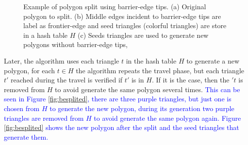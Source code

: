 \begin{figure}[h]
\centering  
{}
\caption{Example of polygon split using barrier-edge tips. (a) Original polygon to split. (b) Middle edges incident to barrier-edge tips are label as frontier-edge and seed triangles (colorful triangles) are store in a hash table $H$ (c) Seeds triangles are used to generate new polygons without barrier-edge tips,  }
\label{figs:splitmid} 
\end{figure}

Later, the algorithm uses each triangle $t$ in the hash table $H$ to generate a new polygon, for each $t \in H$ the algorithm repeats the travel phase, but each triangle $t'$ reached during the travel is verified if $t'$ is in $H$. If it is the case, then the $'t$ is removed from $H$ to avoid generate the same polygon several times. \textcolor{blue}{This can be seen in Figure \ref{fig:besplited}, there are three purple triangles, but just one is chosen from $H$ to generate the new polygon, during its generation two purple triangles are removed from $H$ to avoid generate the same polygon again. Figure \ref{fig:besplited} shows the new polygon after the split and the seed triangles that generate them.}  %

